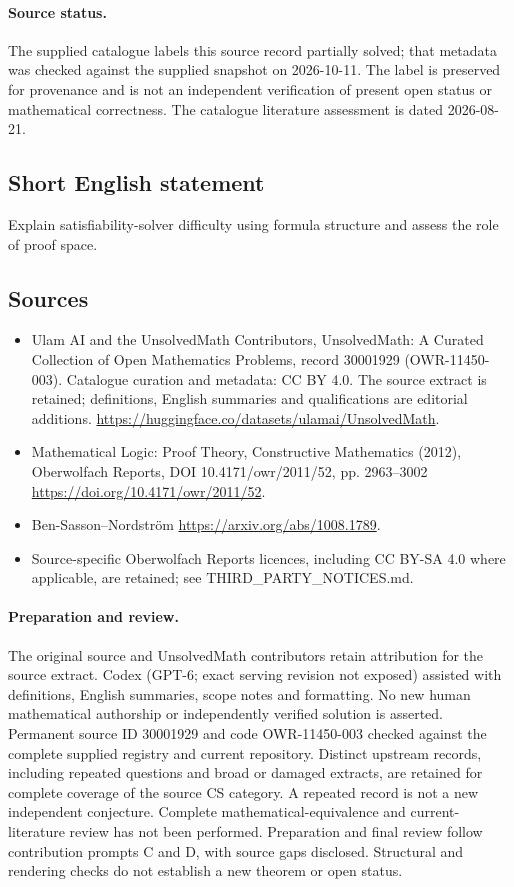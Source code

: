 \documentclass[11pt]{article}
\begin{document}
\paragraph{Source status.}
The supplied catalogue labels this source record partially solved; that metadata was checked against the supplied snapshot on 2026-10-11. The label is preserved for provenance and is not an independent verification of present open status or mathematical correctness. The catalogue literature assessment is dated 2026-08-21.
\subsection{Short English statement}
Explain satisfiability-solver difficulty using formula structure and assess the role of proof space.
\subsection{Sources}
\begin{itemize}
\item[S1] Ulam AI and the UnsolvedMath Contributors, UnsolvedMath: A Curated Collection of Open Mathematics Problems, record 30001929 (OWR-11450-003). Catalogue curation and metadata: CC BY 4.0. The source extract is retained; definitions, English summaries and qualifications are editorial additions.
\url{https://huggingface.co/datasets/ulamai/UnsolvedMath}.
\item[S2] Mathematical Logic: Proof Theory, Constructive Mathematics (2012), Oberwolfach Reports, DOI 10.4171/owr/2011/52, pp. 2963--3002
\url{https://doi.org/10.4171/owr/2011/52}.
\item[S3] Ben-Sasson--Nordström
\url{https://arxiv.org/abs/1008.1789}.
\item Source-specific Oberwolfach Reports licences, including CC BY-SA 4.0 where applicable, are retained; see THIRD\_PARTY\_NOTICES.md.
\end{itemize}
\paragraph{Preparation and review.}
The original source and UnsolvedMath contributors retain attribution for the source extract. Codex (GPT-6; exact serving revision not exposed) assisted with definitions, English summaries, scope notes and formatting. No new human mathematical authorship or independently verified solution is asserted. Permanent source ID 30001929 and code OWR-11450-003 checked against the complete supplied registry and current repository. Distinct upstream records, including repeated questions and broad or damaged extracts, are retained for complete coverage of the source CS category. A repeated record is not a new independent conjecture. Complete mathematical-equivalence and current-literature review has not been performed. Preparation and final review follow contribution prompts C and D, with source gaps disclosed. Structural and rendering checks do not establish a new theorem or open status.
\label{end:30001929}
\end{document}
